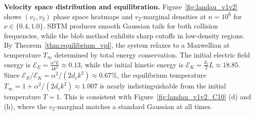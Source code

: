 \documentclass[]{article}
\numberwithin{equation}{section}
\begin{document}
\textbf{Velocity space distribution and equilibration.}  Figure~\ref{fig:landau_v1v2} shows $(v_1, v_2)$ phase space heatmaps and $v_2$-marginal densities at $n = 10^6$ for $\nu \in \{0.4, 1.0\}$.  SBTM produces smooth Gaussian tails for both collision frequencies, while the blob method exhibits sharp cutoffs in low-density regions. By Theorem~\ref{thm:equilibrium_vpl}, the system relaxes to a Maxwellian at temperature $T_\infty$ determined by total energy conservation.  The initial electric field energy is $\mathcal{E}_E = \frac{\alpha^2 L}{4k^2} \approx 0.13$, while the initial kinetic energy is $\mathcal{E}_K = \frac{d_v}{2} L \approx 18.85$.  Since $\mathcal{E}_E /\mathcal{E}_K= \alpha^2 / (2 d_v k^2) \approx 0.67\%$, the equilibrium temperature $T_\infty = 1 + \alpha^2/(2 d_v k^2) \approx 1.007$ is nearly indistinguishable from the initial temperature $T = 1$.  This is consistent with Figure~\ref{fig:landau_v1v2_C10} (d) and (h), where the $v_2$-marginal matches a standard Gaussian at all times.



\end{document}

